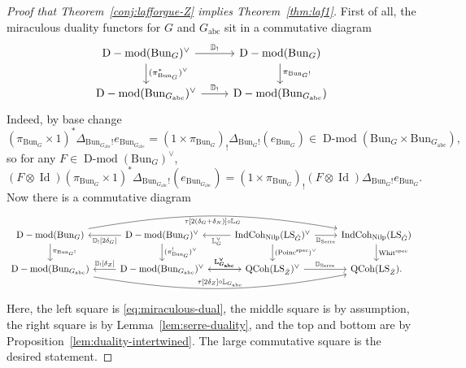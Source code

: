 \documentclass[10pt,a4paper]{amsart}
\newcommand{\Bun}{{\mathrm{Bun}}}
\DeclareMathOperator{\Dmod}{D-mod}
\DeclareMathOperator{\IndCoh}{IndCoh}
\DeclareMathOperator{\LS}{LS}
\newcommand{\Nilp}{\mathrm{Nilp}}
\newcommand{\Poinc}{\operatorname{Poinc}}
\DeclareMathOperator{\QCoh}{QCoh}
\newcommand{\Whit}{\operatorname{Whit}}
\newcommand{\abc}{{\mathrm{abc}}}
\newcommand{\spec}{\mathrm{spec}}
\begin{document}
\begin{proof}[Proof that Theorem~\ref{conj:lafforgue-Z} implies Theorem~\ref{thm:laf1}]
First of all, the miraculous duality functors for $G$ and $G_\abc$ sit in a commutative diagram
\begin{equation}\label{eq:miraculous-dual}
\begin{tikzcd}
\Dmod(\Bun_G)^\vee\arrow{r}{\mathbb D_!}\arrow{d}{(\pi^*_{\Bun_G})^\vee}&\Dmod(\Bun_G)\arrow{d}{\pi_{\Bun_G!}}\\
\Dmod(\Bun_{G_\abc})^\vee\arrow{r}{\mathbb D_!}&\Dmod(\Bun_{G_\abc})
\end{tikzcd}
\end{equation}
Indeed, by base change
\[
(\pi_{\Bun_G}\times1)^*\Delta_{\Bun_{G_\abc}!}e_{\Bun_{G_\abc}}=(1\times\pi_{\Bun_G})_!\Delta_{\Bun_G!}(e_{\Bun_G})\in\Dmod(\Bun_G\times\Bun_{G_\abc}),
\]
so for any $F\in\Dmod(\Bun_G)^\vee$,
\begin{equation}
(F\otimes\operatorname{Id})(\pi_{\Bun_G}\times1)^*\Delta_{\Bun_{G_\abc}!}(e_{\Bun_{G_\abc}})=(1\times\pi_{\Bun_G})_!(F\otimes\operatorname{Id})\Delta_{\Bun_G!}e_{\Bun_G}.
\end{equation}
Now there is a commutative diagram
\[
\begin{tikzcd}
    \Dmod(\Bun_G)\arrow[swap,bend left=10]{rrr}{\tau[2(\delta_G+\delta_N)]\circ\mathbb L_G}\arrow{d}{\pi_{\Bun_G!}}&\arrow{l}{\mathbb D_![2\delta_G]}\Dmod(\Bun_G)^\vee\arrow{d}{(\pi_{\Bun_G}^!)^\vee}&\arrow{l}{\mathbb L_G^\vee}\IndCoh_\Nilp(\LS_{\check G})^\vee\arrow{d}{(\Poinc^\spec)^\vee}\arrow[swap]{r}{\mathbb D_{\mathrm{Serre}}}&\IndCoh_\Nilp(\LS_{\check G})\arrow{d}{\Whit^\spec}\\
    \Dmod(\Bun_{G_{\mathrm{abc}}})\arrow[bend right=10]{rrr}{\tau[2\delta_Z]\circ\mathbb L_{G_\abc}}&\arrow[swap]{l}{\mathbb D_![\delta_Z]}\Dmod(\Bun_{G_{\mathrm{abc}}})^\vee\arrow{r}{\mathbb L_{G_{\mathrm{abc}}}^\vee}&\arrow[swap]{l}{\mathbb L_{G_\abc}^\vee}\QCoh(\LS_{\check Z})^\vee\arrow{r}{\mathbb D_{\mathrm{Serre}}}&\QCoh(\LS_{\check Z}).
    \end{tikzcd}
\]
Here, the left square is \eqref{eq:miraculous-dual}, the middle square is by assumption, the right square is by Lemma~\ref{lem:serre-duality}, and the top and bottom are by Proposition~\ref{lem:duality-intertwined}. The large commutative square is the desired statement.
\end{proof}
\end{document}
